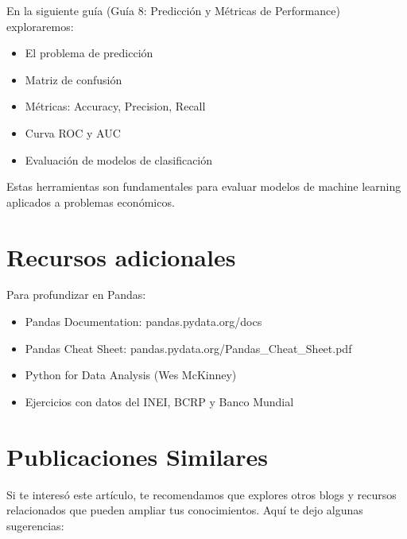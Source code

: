 \documentclass[
  doc,
  floatsintext,
  longtable,
  a4paper,
  nolmodern,
  notxfonts,
  notimes,
  12pt,
  colorlinks=true,linkcolor=blue,citecolor=blue,urlcolor=blue]{apa7}
\providecommand{\tightlist}{%
  \setlength{\itemsep}{0pt}\setlength{\parskip}{0pt}}
\begin{document}
En la siguiente guía (Guía 8: Predicción y Métricas de Performance)
exploraremos:

\begin{itemize}
\tightlist
\item
  El problema de predicción
\item
  Matriz de confusión
\item
  Métricas: Accuracy, Precision, Recall
\item
  Curva ROC y AUC
\item
  Evaluación de modelos de clasificación
\end{itemize}

Estas herramientas son fundamentales para evaluar modelos de machine
learning aplicados a problemas económicos.

\section{Recursos adicionales}\label{recursos-adicionales}

Para profundizar en Pandas:

\begin{itemize}
\tightlist
\item
  Pandas Documentation: pandas.pydata.org/docs
\item
  Pandas Cheat Sheet: pandas.pydata.org/Pandas\_Cheat\_Sheet.pdf
\item
  Python for Data Analysis (Wes McKinney)
\item
  Ejercicios con datos del INEI, BCRP y Banco Mundial
\end{itemize}

\section{Publicaciones Similares}\label{publicaciones-similares}

Si te interesó este artículo, te recomendamos que explores otros blogs y
recursos relacionados que pueden ampliar tus conocimientos. Aquí te dejo
algunas sugerencias:
\end{document}
